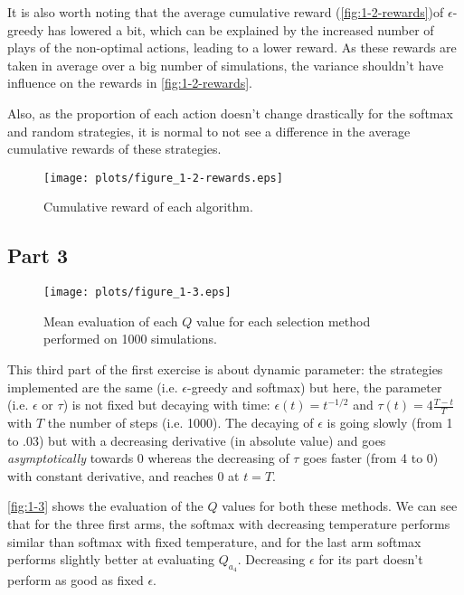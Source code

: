 \documentclass{article}
\begin{document}
It is also worth noting that the average cumulative reward (\autoref{fig:1-2-rewards})of $\epsilon$-greedy has lowered a bit,
which can be explained by the increased number of plays of the non-optimal actions, leading to a lower reward. As these rewards
are taken in average over a big number of simulations, the variance shouldn't have influence on the rewards in \autoref{fig:1-2-rewards}.

Also, as the proportion of each action doesn't change drastically for the softmax and random strategies, it is normal to not see
a difference in the average cumulative rewards of these strategies.

\begin{figure}[!t]
\centering
\texttt{[image: plots/figure\_1-2-rewards.eps]}
\caption{Cumulative reward of each algorithm.\label{fig:1-2-rewards}}
\end{figure}

\subsection{Part 3}

\begin{figure}[!t]
\hspace{-3cm}
\texttt{[image: plots/figure\_1-3.eps]}
\caption{Mean evaluation of each $Q$ value for each selection method performed on 1000 simulations.\label{fig:1-3}}
\end{figure}

This third part of the first exercise is about dynamic parameter: the strategies implemented are the same (i.e. $\epsilon$-greedy
and softmax) but here, the parameter (i.e. $\epsilon$ or $\tau$) is not fixed but decaying with time: $\epsilon(t) = t^{-1/2}$
and $\tau(t) = 4\frac {T-t}{T}$ with $T$ the number of steps (i.e. 1000). The decaying of $\epsilon$ is going slowly (from 1 to $.03$)
but with a decreasing derivative (in absolute value) and goes \textit{asymptotically} towards 0 whereas the decreasing of $\tau$
goes faster (from 4 to 0) with constant derivative, and reaches 0 at $t=T$.

\autoref{fig:1-3} shows the evaluation of the $Q$ values for both these methods. We can see that for the three first arms, the softmax
with decreasing temperature performs similar than softmax with fixed temperature, and for the last arm softmax performs slightly better
at evaluating $Q_{a_4}$. Decreasing $\epsilon$ for its part doesn't perform as good as fixed $\epsilon$.
\end{document}
